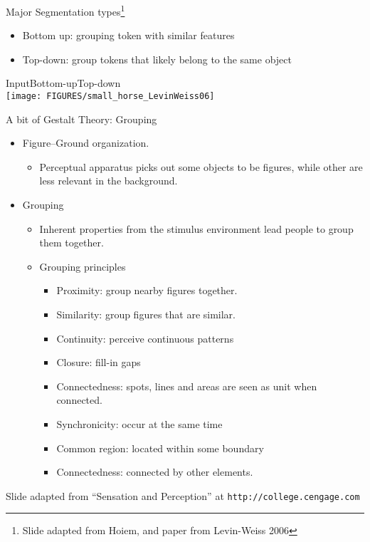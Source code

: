 \documentclass[9pt]{beamer}
\begin{document}
\begin{frame}{Major Segmentation types\footnote{Slide adapted from Hoiem, and paper from Levin-Weiss 2006}}
  \begin{itemize}
  \item Bottom up: grouping token with similar features
  \item Top-down: group tokens that likely belong to the same object
    \vfill
  \end{itemize}
    \begin{center}
      Input\hfill Bottom-up\hfill Top-down\\
      \texttt{[image: FIGURES/small\_horse\_LevinWeiss06]}
    \end{center}
\end{frame}

\begin{frame}[t]{A bit of Gestalt Theory: Grouping}
  \begin{itemize}
  \item Figure--Ground organization.
    \begin{itemize}
    \item Perceptual apparatus picks out some objects to be figures, while other are less relevant in the background.
    \end{itemize}
  \item Grouping
    \begin{itemize}
    \item Inherent properties from the stimulus environment lead people to group them together.
    \item Grouping principles
      \begin{itemize}
      \item Proximity: group nearby figures together.
      \item Similarity: group figures that are similar.
      \item Continuity: perceive continuous patterns
      \item Closure: fill-in gaps
      \item Connectedness: spots, lines and areas are seen as unit when connected. 
      \item Synchronicity: occur at the same time
      \item Common region: located within some boundary
      \item Connectedness: connected by other elements.
      \end{itemize}
    \end{itemize}
  \end{itemize}
  \vfill
  {\fontsize{6}{6}\selectfont Slide adapted from ``Sensation and Perception'' at \texttt{http://college.cengage.com}}
\end{frame}
\end{document}
